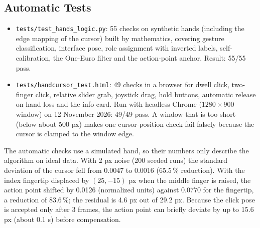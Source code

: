 \documentclass[11pt,a4paper]{article}
\newcommand{\code}[1]{\texttt{\small #1}}
\begin{document}
\subsection{Automatic Tests}
\begin{itemize}
  \item \code{tests/test\_hands\_logic.py}: 55 checks on synthetic hands (including the edge mapping of the cursor) built by mathematics, covering gesture classification, interface pose, role assignment with inverted labels, self-calibration, the One-Euro filter and the action-point anchor. Result: 55/55 pass.
  \item \code{tests/handcursor\_test.html}: 49 checks in a browser for dwell click, two-finger click, relative slider grab, joystick drag, hold buttons, automatic release on hand loss and the info card. Run with headless Chrome ($1280\times900$ window) on 12 November 2026: 49/49 pass. A window that is too short (below about 500 px) makes one cursor-position check fail falsely because the cursor is clamped to the window edge.
\end{itemize}
The automatic checks use a simulated hand, so their numbers only describe the algorithm on ideal data. With 2 px noise (200 seeded runs) the standard deviation of the cursor fell from 0.0047 to 0.0016 (65.5\,\% reduction). With the index fingertip displaced by $(25,-15)$ px when the middle finger is raised, the action point shifted by 0.0126 (normalized units) against 0.0770 for the fingertip, a reduction of 83.6\,\%; the residual is 4.6 px out of 29.2 px. Because the click pose is accepted only after 3 frames, the action point can briefly deviate by up to 15.6 px (about 0.1 s) before compensation.
\end{document}
